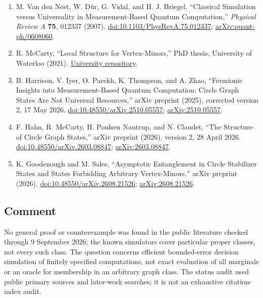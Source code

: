 \begin{enumerate}[label={},leftmargin=4.8em,labelsep=0.5em]
  \footnotesize
  \item[\textup{[VDVB07]}]\label{ref:gsc-rank-width}
  M. Van den Nest, W. Dür, G. Vidal, and H. J. Briegel, ``Classical Simulation versus Universality in Measurement-Based Quantum Computation,'' \emph{Physical Review A} \textbf{75}, 012337 (2007). \href{https://doi.org/10.1103/PhysRevA.75.012337}{doi:10.1103/PhysRevA.75.012337}; \href{https://arxiv.org/abs/quant-ph/0608060}{arXiv:quant-ph/0608060}.

  \item[\textup{[McC21]}]\label{ref:gsc-geelen}
  R. McCarty, ``Local Structure for Vertex-Minors,'' PhD thesis, University of Waterloo (2021). \href{https://uwspace.uwaterloo.ca/items/1cfbfc52-2e30-44a4-b3fb-28493c3d94f0}{University repository}.

  \item[\textup{[HIP+25]}]\label{ref:gsc-circle-simulation}
  B. Harrison, V. Iyer, O. Parekh, K. Thompson, and A. Zhao, ``Fermionic Insights into Measurement-Based Quantum Computation: Circle Graph States Are Not Universal Resources,'' arXiv preprint (2025), corrected version 2, 17 May 2026. \href{https://doi.org/10.48550/arXiv.2510.05557}{doi:10.48550/arXiv.2510.05557}; \href{https://arxiv.org/abs/2510.05557}{arXiv:2510.05557}.

  \item[\textup{[HMNC26]}]\label{ref:gsc-circle-structure}
  F. Hahn, R. McCarty, H. Poulsen Nautrup, and N. Claudet, ``The Structure of Circle Graph States,'' arXiv preprint (2026), version 2, 28 April 2026. \href{https://doi.org/10.48550/arXiv.2603.08847}{doi:10.48550/arXiv.2603.08847}; \href{https://arxiv.org/abs/2603.08847}{arXiv:2603.08847}.

  \item[\textup{[GS26]}]\label{ref:gsc-asymptotic}
  K. Goodenough and M. Sales, ``Asymptotic Entanglement in Circle Stabilizer States and States Forbidding Arbitrary Vertex-Minors,'' arXiv preprint (2026). \href{https://doi.org/10.48550/arXiv.2608.21526}{doi:10.48550/arXiv.2608.21526}; \href{https://arxiv.org/abs/2608.21526}{arXiv:2608.21526}.
\end{enumerate}

\subsection*{Comment}

No general proof or counterexample was found in the public literature checked through 9 September 2026; the known simulators cover particular proper classes, not every such class. The question concerns efficient bounded-error decision simulation of finitely specified computations, not exact evaluation of all marginals or an oracle for membership in an arbitrary graph class. The status audit used public primary sources and later-work searches; it is not an exhaustive citation-index audit.

